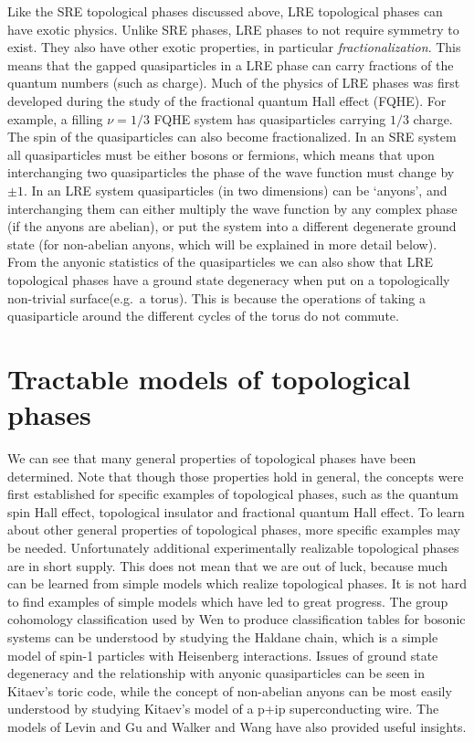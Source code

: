 Like the SRE topological phases discussed above, LRE topological phases can have exotic physics. Unlike SRE phases, LRE phases to not require symmetry to exist. They also have other exotic properties, in particular \emph{fractionalization}. This means that the gapped quasiparticles in a LRE phase can carry fractions of the quantum numbers (such as charge). Much of the physics of LRE phases was first developed during the study of the fractional quantum Hall effect (FQHE). For example, a filling $\nu=1/3$ FQHE system has quasiparticles carrying $1/3$ charge. The spin of the quasiparticles can also become fractionalized. In an SRE system all quasiparticles must be either bosons or fermions, which means that upon interchanging two quasiparticles the phase of the wave function must change by $\pm 1$. In an LRE system quasiparticles (in two dimensions) can be `anyons', and interchanging them can either multiply the wave function by any complex phase (if the anyons are abelian), or put the system into a different degenerate ground state (for non-abelian anyons, which will be explained in more detail below). 
From the anyonic statistics of the quasiparticles we can also show that LRE topological phases have a ground state degeneracy when put on a topologically non-trivial surface(e.g.~a torus). This is because the operations of taking a quasiparticle around the different cycles of the torus do not commute.

\section{Tractable models of topological phases}

	We can see that many general properties of topological phases have been determined. Note that though those properties hold in general, the concepts were first established for specific examples of topological phases, such as the quantum spin Hall effect, topological insulator and fractional quantum Hall effect. To learn about other general properties of topological phases, more specific examples may be needed. Unfortunately additional experimentally realizable topological phases are in short supply. This does not mean that we are out of luck, because much can be learned from simple models which realize topological phases. It is not hard to find examples of simple models which have led to great progress. The group cohomology classification used by Wen to produce classification tables for bosonic systems\cite{WenScience,*WenPRB} can be understood by studying the Haldane chain, which is a simple model of spin-1 particles with Heisenberg interactions. Issues of ground state degeneracy and the relationship with anyonic quasiparticles can be seen in Kitaev's toric code\cite{KitaevHouches}, while the concept of non-abelian anyons can be most easily understood by studying Kitaev's model of a p+ip superconducting wire. The models of Levin and Gu\cite{LevinGu} and Walker and Wang\cite{WalkerWang,BurnellSimon} have also provided useful insights.


